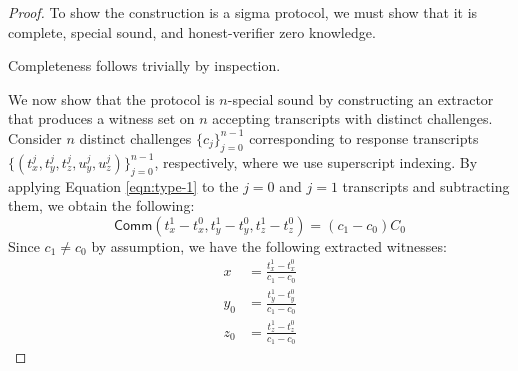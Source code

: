 \documentclass{article}
\newcommand{\func}[1]{\mathsf{#1}}
\newcommand{\comm}{\func{Comm}}
\begin{document}
\begin{proof}
To show the construction is a sigma protocol, we must show that it is complete, special sound, and honest-verifier zero knowledge.

Completeness follows trivially by inspection.

We now show that the protocol is $n$-special sound by constructing an extractor that produces a witness set on $n$ accepting transcripts with distinct challenges.
Consider $n$ distinct challenges $\{c_j\}_{j=0}^{n-1}$ corresponding to response transcripts $\{(t_x^j, t_y^j, t_z^j, u_y^j, u_z^j)\}_{j=0}^{n-1}$, respectively, where we use superscript indexing.
By applying Equation \ref{eqn:type-1} to the $j = 0$ and $j = 1$ transcripts and subtracting them, we obtain the following:
$$\comm(t_x^1 - t_x^0, t_y^1 - t_y^0, t_z^1 - t_z^0) = (c_1 - c_0)C_0$$
Since $c_1 \neq c_0$ by assumption, we have the following extracted witnesses:
\begin{align*}
    x &= \frac{t_x^1 - t_x^0}{c_1 - c_0} \\
    y_0 &= \frac{t_y^1 - t_y^0}{c_1 - c_0} \\
    z_0 &= \frac{t_z^1 - t_z^0}{c_1 - c_0}
\end{align*}


\end{proof}
\end{document}
